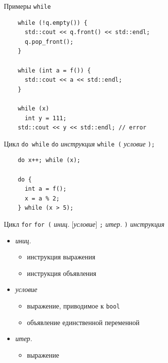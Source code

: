 \documentclass[unknownkeysallowed,xcolor=table]{beamer}
\begin{document}
\begin{frame}[fragile]{Примеры \lstinline{while}}
  \begin{lstlisting}
    while (!q.empty()) {
      std::cout << q.front() << std::endl;
      q.pop_front();
    }

    while (int a = f()) {
      std::cout << a << std::endl;
    }

    while (x)
      int y = 111;
    std::cout << y << std::endl; // error
  \end{lstlisting}
\end{frame}

\begin{frame}[fragile]{Цикл \lstinline{do while}}
  \lstinline{do} \emph{инструкция} \lstinline{while (} \emph{условие} \lstinline{);}

  \vspace{1em}

  \begin{lstlisting}
    do x++; while (x);

    do {
      int a = f();
      x = a % 2;
    } while (x > 5);
  \end{lstlisting}
\end{frame}

\begin{frame}[fragile]{Цикл \lstinline{for}}
  \lstinline{for (} \emph{иниц.} [\emph{условие}] \lstinline{;} \emph{итер.} \lstinline{)} \emph{инструкция}

  \vspace{0.5em}

  \begin{itemize}
    \item \emph{иниц.}
      \begin{itemize}
        \item инструкция выражения \vspace{0.5em}
        \item инструкция объявления \vspace{1em}
      \end{itemize}
    \item \emph{условие}
      \begin{itemize}
        \item выражение, приводимое к \lstinline{bool} \vspace{0.5em}
        \item объявление единственной переменной \vspace{1em}
      \end{itemize}
    \item \emph{итер.}
      \begin{itemize}
        \item выражение
      \end{itemize}
  \end{itemize}
\end{frame}
\end{document}
